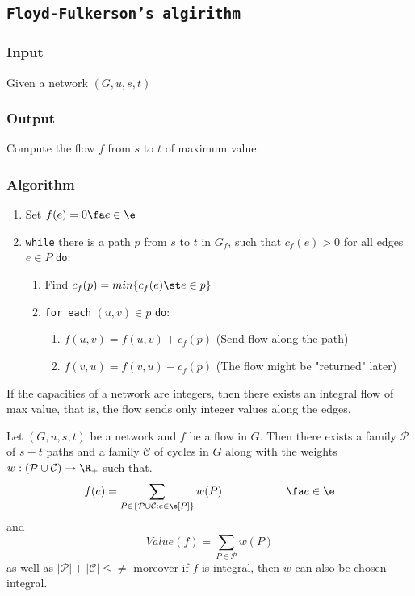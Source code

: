 \subsection{\texttt{Floyd-Fulkerson's algirithm}}
\subsubsection{Input}
    Given a network $(G, u, s, t)$
\subsubsection{Output}
    Compute the flow $f$ from $s$ to $t$ of maximum value.
\subsubsection{Algorithm}
\begin{enumerate}
    \item Set $f(e) = 0 \fa e \in \e$
    \item \texttt{while} there is a path $p$ from $s$ to $t$ in $G_f$, such that $c_f(e) > 0$ for all edges $e \in P$ \texttt{do}:
    \begin{enumerate}[label=\Alph*]
        \item Find $c_f(p) = min\{c_f(e)\st e \in p\}$
        \item \texttt{for each} $(u, v) \in p$ \texttt{do}:
        \begin{enumerate}[label=\alph*]
            \item $f(u, v) = f(u, v) + c_f(p)$ \hspace{2cm} (Send flow along the path)
            \item $f(v, u) = f(v, u) - c_f(p)$ \hspace{2cm} (The flow might be "returned" later)
        \end{enumerate}
    \end{enumerate}
\end{enumerate}
\begin{customcorollary}{3.16}
\label{corollary:3.16}
    If the capacities of a network are integers, then there exists an integral flow of max value, that is, the flow sends only integer values along the edges.
\end{customcorollary}
\begin{customtheorem}{3.17}
\label{theorem:3.17}
    Let $(G, u, s, t)$ be a network and $f$ be a flow in $G$. Then there exists a family $\mathcal{P}$ of $s - t$ paths and a family $\mathcal{C}$ of cycles in $G$ along with the weights $w: (\mathcal{P} \cup \mathcal{C}) \rightarrow \R_+$ such that.
    \begin{equation*}
        f(e) = \sum_{P \in \{\mathcal{P} \cup \mathcal{C}: e \in \e[P]\}} w(P) \hspace{2cm} \fa e \in \e
    \end{equation*}
    and
    \begin{equation*}
        Value(f) = \sum_{P \in \mathcal{P}} w(P)
    \end{equation*}
    as well as $|\mathcal{P}| + |\mathcal{C}| \leq \ne$ moreover if $f$ is integral, then $w$ can also be chosen integral.
\end{customtheorem}
